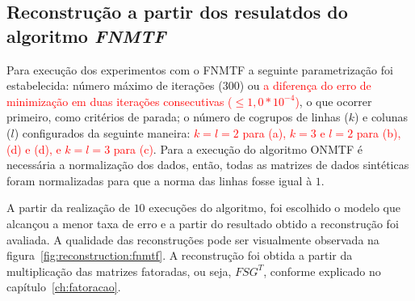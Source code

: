 \documentclass[
    12pt,                %
    oneside,            %
    a4paper,            %
    english,            %
    brazil                %
    ]{abntex2ppgsi}
\begin{document}

\subsection{Reconstrução a partir dos resulatdos do algoritmo \textit{FNMTF}}
\label{subsec:results-reconstruction-fnmtf}


Para execução dos experimentos com o FNMTF a seguinte parametrização foi estabelecida: número máximo de iterações ($300$) ou \textcolor{red}{a diferença do erro de minimização em duas iterações consecutivas ($\leq 1,0 * 10^{-4}$)}, o que ocorrer primeiro, como critérios de parada; o número de cogrupos de linhas ($k$) e colunas ($l$) configurados da seguinte maneira: \textcolor{red}{$k = l = 2$ para (a), $k = 3$ e $l = 2 $ para (b), (d) e (d), e $k = l = 3$ para (c)}. Para a execução do algoritmo ONMTF é necessária a normalização dos dados, então, todas as matrizes de dados sintéticas foram normalizadas para que a norma das linhas fosse igual à $1$.

A partir da realização de $10$ execuções do algoritmo, foi escolhido o modelo que alcançou a menor taxa de erro e a partir do resultado obtido a reconstrução foi avaliada. A qualidade das reconstruções pode ser visualmente observada na figura~\ref{fig:reconstruction:fnmtf}. A reconstrução foi obtida a partir da multiplicação das matrizes fatoradas, ou seja, $FSG^T$, conforme explicado no capítulo~\ref{ch:fatoracao}.
\end{document}
